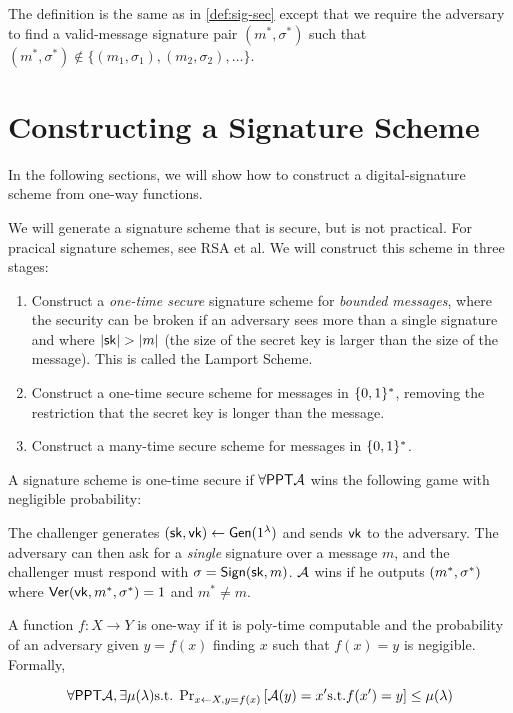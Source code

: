 The definition is the same as in \cref{def:sig-sec} except that we require
the adversary to find a valid-message signature pair $(m^*, \sigma^*)$
such that $(m^*, \sigma^*) \not \in \{ (m_1, \sigma_1), (m_2, \sigma_2), \dots \}$.

\section{Constructing a Signature Scheme}
In the following sections, we will show how to construct a digital-signature
scheme from one-way functions.

We will generate a signature scheme that is secure, but is not practical. For pracical signature schemes, see RSA et al. We will construct this scheme in three stages:

\begin{enumerate}
	\item Construct a \emph{one-time secure} signature scheme for \emph{bounded messages}, where the security can be broken if an adversary sees more than a single signature and where $\left| {\mathsf{sk}} \right| > \left| m \right|$ (the size of the secret key is larger than the size of the message). This is called the Lamport Scheme. %
	\item Construct a one-time secure scheme for messages in $\{0,1\}^*$, removing the restriction that the secret key is longer than the message.
	\item Construct a many-time secure scheme for messages in $\{0,1\}^*$.
\end{enumerate}

\begin{definition}
	A signature scheme is one-time secure if $\forall \mathsf{PPT} \mathcal{A}$ wins the following game with negligible probability:

	The challenger generates $({\mathsf{sk}}, \mathsf{vk}) \leftarrow \mathsf{Gen}(1^\lambda)$ and sends $\mathsf{vk}$ to the adversary. The adversary can then ask for a \emph{single} signature over a message $m$, and the challenger must respond with $\sigma = \mathsf{Sign}({\mathsf{sk}}, m)$. $\mathcal{A}$ wins if he outputs $(m^*, \sigma^*)$ where $\mathsf{Ver}(\mathsf{vk}, m^*, \sigma^*) = 1$ and $m^* \neq m$.
\end{definition}


\begin{definition}
	A function $f: X \rightarrow Y$ is one-way if it is poly-time computable and the probability of an adversary given $y=f(x)$ finding $x$ such that $f(x) = y$ is negigible. Formally,

	\[ \forall \mathsf{PPT} \mathcal{A}, \exists \mu(\lambda) \text{s.t. } \text{Pr}_{x \leftarrow X, y = f(x)}\left[\mathcal{A}(y) = x' \text{s.t.} f(x')=y\right] \leq \mu(\lambda) \]
\end{definition}

